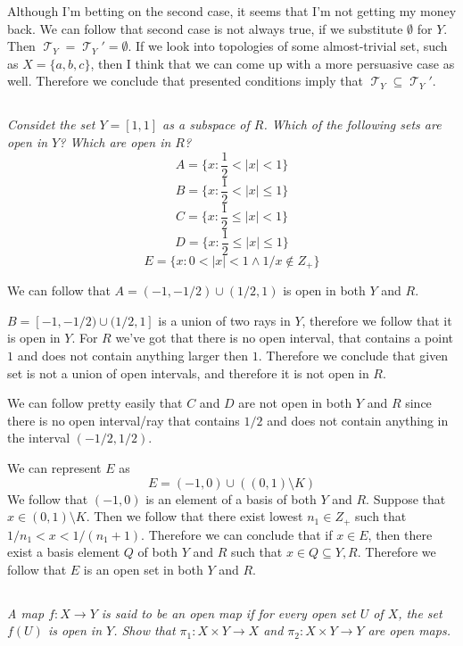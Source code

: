 \documentclass[11pt,oneside,titlepage]{book}
\DeclareMathOperator \topol {\mathcal {T}}
\newcommand{\set}[1]{\{ #1 \}}
\begin{document}
Although I'm betting on the second case, it seems that I'm not getting my money back.
We can follow that second case is not always true, if we substitute $\emptyset$ for $Y$.
Then $\topol_Y = \topol_Y' = \emptyset$. If we look into topologies of some
almost-trivial set, such as $X = \set{a, b, c}$, then I think that we can come up with a more
persuasive case as well. Therefore we conclude that
presented conditions imply that $\topol_Y \subseteq \topol_Y'$.

\subsection{}

\textit{Considet the set $Y = [1, 1]$ as a subspace of $R$. Which of the following sets are
  open in $Y$? Which are open in $R$?
  $$A = \set{x : \frac{1}{2} < |x| < 1 }$$
  $$B = \set{x : \frac{1}{2} < |x| \leq 1 }$$
  $$C = \set{x : \frac{1}{2} \leq |x| < 1 }$$
  $$D = \set{x : \frac{1}{2} \leq |x| \leq 1 }$$
  $$E = \set{x : 0 < |x| < 1 \land 1/x \notin Z_+ }$$
}

We can follow that
$A = (-1, -1/2) \cup (1/2, 1)$
is open in both $Y$ and $R$.

$B = [-1, -1/2) \cup (1/2, 1]$
is a union of two rays in $Y$, therefore we follow that it is open in $Y$. For $R$ we've got that
there is no open interval, that contains a point $1$ and does not contain anything larger
then $1$. Therefore we conclude that given set is not a union of open intervals, and therefore
it is not open in $R$.

We can follow pretty easily that $C$ and $D$ are not open in both $Y$ and $R$ since there is
no open interval/ray that contains $1/2$ and does not contain anything in the interval
$(-1/2, 1/2)$.

We can represent $E$ as
$$E = (-1, 0) \cup ((0, 1) \setminus K)$$
We follow that $(-1, 0)$ is an element of a basis of both $Y$ and $R$. Suppose
that $x \in (0, 1) \setminus K$. Then we follow that there exist lowest $n_1 \in Z_+$ such that
$1/n_1 < x < 1/(n_1 + 1)$. Therefore we can conclude that if $x \in E$, then there exist
a basis element $Q$ of both $Y$ and $R$ such that $x \in Q \subseteq Y, R$. Therefore
we follow that $E$ is an open set in both $Y$ and $R$.

\subsection{}

\textit{A map $f: X \to Y$ is said to be an open map if for every open set $U$ of $X$, the
  set $f(U)$ is open in $Y$. Show that $\pi_1: X \times Y \to X$ and
  $\pi_2 : X \times Y \to Y$ are open maps.}
\end{document}
